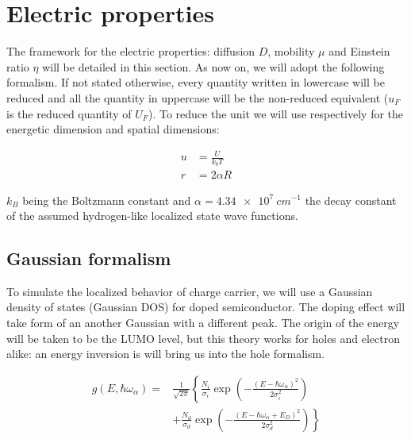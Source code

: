 
\chapter{Electric properties}
\label{chap:elec}

The framework for the electric properties: diffusion $D$, mobility $\mu$ and Einstein ratio $\eta$ will be detailed in this section. As now on, we will adopt the following formalism. If not stated otherwise, every quantity written in lowercase will be reduced and all the quantity in uppercase will be the non-reduced equivalent ($u_F$ is the reduced quantity of $U_F$). To reduce the unit we will use respectively for the energetic dimension and spatial dimensions:

\begin{equation}
    \begin{aligned}
        u &= \frac{U}{k_bT}\\
        r &= 2\alpha R
    \end{aligned}
\end{equation}

$k_B$ being the Boltzmann constant and $\alpha = \SI{4.34e7}{cm^{-1}}$ the decay constant of the assumed hydrogen-like localized state wave functions.

\section{Gaussian formalism}

To simulate the localized behavior of charge carrier, we will use a Gaussian density of states (Gaussian DOS) for doped semiconductor. The doping effect will take form of an another Gaussian with a different peak. The origin of the energy will be taken to be the LUMO level, but this theory works for holes and electron alike: an energy inversion is will bring us into the hole formalism.

\begin{equation}
    \begin{aligned}
    g\left(E, \hbar \omega_{\alpha}\right)=& \frac{1}{\sqrt{2 \pi}}\left\{\frac{N_{i}}{\sigma_{i}} \exp \left(-\frac{\left(E-\hbar \omega_{\alpha}\right)^{2}}{2 \sigma_{i}^{2}}\right)\right.\\
    &\left.+\frac{N_{d}}{\sigma_{d}} \exp \left(-\frac{\left(E-\hbar \omega_{\alpha}+E_{D}\right)^{2}}{2 \sigma_{d}^{2}}\right)\right\}
    \end{aligned}
    \label{eq:DOS_e}
\end{equation}


